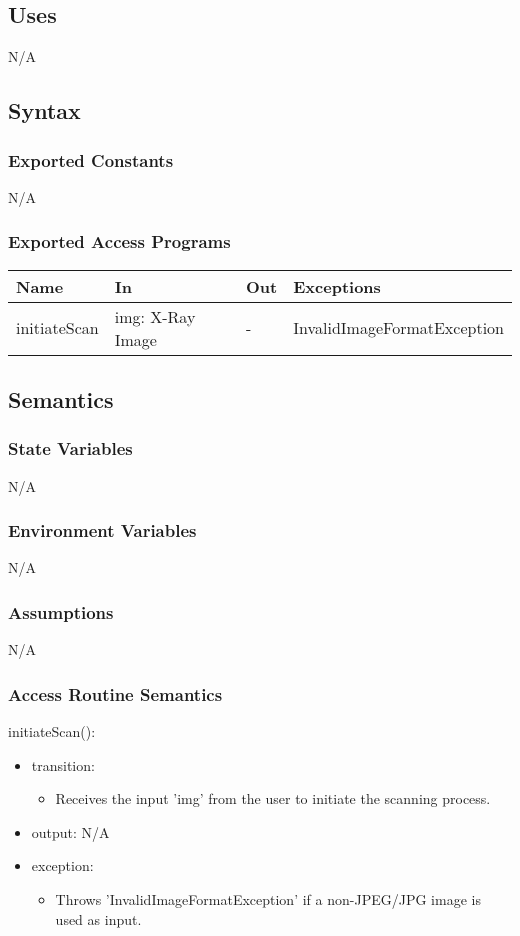 \documentclass[12pt, titlepage]{article}
\begin{document}
\subsection{Uses}
N/A
\subsection{Syntax}

\subsubsection{Exported Constants}
N/A
\subsubsection{Exported Access Programs}

\begin{center}
\begin{tabular}{p{3cm} p{4cm} p{2cm} p{5cm}}
\hline
\textbf{Name} & \textbf{In} & \textbf{Out} & \textbf{Exceptions} \\
\hline
initiateScan & img: X-Ray Image & - & InvalidImageFormatException \\
\hline
\end{tabular}
\end{center}

\subsection{Semantics}

\subsubsection{State Variables}
N/A
\subsubsection{Environment Variables}
N/A
\subsubsection{Assumptions}
N/A
\subsubsection{Access Routine Semantics}

\noindent initiateScan():
\begin{itemize}
\item transition: \begin{itemize}
    \item Receives the input 'img' from the user to initiate the scanning process.
\end{itemize}
\item output: N/A 
\item exception: \begin{itemize}
    \item Throws 'InvalidImageFormatException' if a non-JPEG/JPG image is used as input.
\end{itemize}
\end{itemize}
\end{document}
